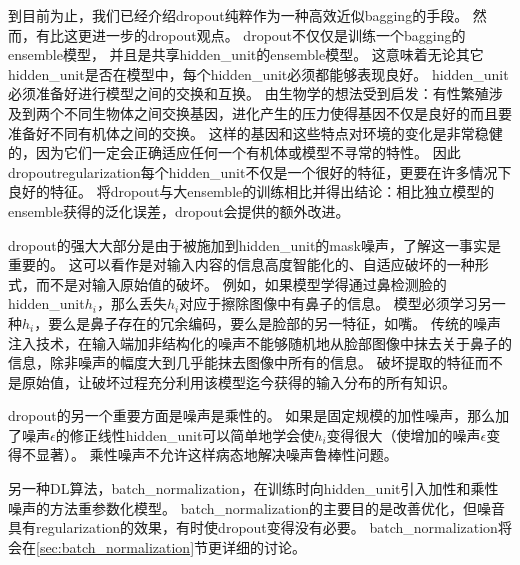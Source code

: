
到目前为止，我们已经介绍\gls{dropout}纯粹作为一种高效近似\gls{bagging}的手段。
然而，有比这更进一步的\gls{dropout}观点。
\gls{dropout}不仅仅是训练一个\gls{bagging}的\gls{ensemble}模型，
并且是共享\gls{hidden_unit}的\gls{ensemble}模型。
这意味着无论其它\gls{hidden_unit}是否在模型中，每个\gls{hidden_unit}必须都能够表现良好。
\gls{hidden_unit}必须准备好进行模型之间的交换和互换。
\cite{Hinton-et-al-arxiv2012-small}由生物学的想法受到启发：有性繁殖涉及到两个不同生物体之间交换基因，进化产生的压力使得基因不仅是良好的而且要准备好不同有机体之间的交换。
这样的基因和这些特点对环境的变化是非常稳健的，因为它们一定会正确适应任何一个有机体或模型不寻常的特性。
因此\gls{dropout}\gls{regularization}每个\gls{hidden_unit}不仅是一个很好的特征，更要在许多情况下良好的特征。
\cite{WardeFarley+al-ICLR2014}将\gls{dropout}与大\gls{ensemble}的训练相比并得出结论：相比独立模型的\gls{ensemble}获得的泛化误差，\gls{dropout}会提供的额外改进。

\gls{dropout}的强大大部分是由于被施加到\gls{hidden_unit}的\gls{mask}噪声，了解这一事实是重要的。
这可以看作是对输入内容的信息高度智能化的、自适应破坏的一种形式，而不是对输入原始值的破坏。
例如，如果模型学得通过鼻检测脸的\gls{hidden_unit}$h_i$，那么丢失$h_i$对应于擦除图像中有鼻子的信息。
模型必须学习另一种$h_i$，要么是鼻子存在的冗余编码，要么是脸部的另一特征，如嘴。
传统的噪声注入技术，在输入端加非结构化的噪声不能够随机地从脸部图像中抹去关于鼻子的信息，除非噪声的幅度大到几乎能抹去图像中所有的信息。
破坏提取的特征而不是原始值，让破坏过程充分利用该模型迄今获得的输入分布的所有知识。

\gls{dropout}的另一个重要方面是噪声是乘性的。
如果是固定规模的加性噪声，那么加了噪声$\epsilon$的修正线性\gls{hidden_unit}可以简单地学会使$h_i$变得很大（使增加的噪声$\epsilon$变得不显著）。
乘性噪声不允许这样病态地解决噪声鲁棒性问题。


另一种\gls{DL}算法，\gls{batch_normalization}，在训练时向\gls{hidden_unit}引入加性和乘性噪声的方法重参数化模型。
\gls{batch_normalization}的主要目的是改善优化，但噪音具有\gls{regularization}的效果，有时使\gls{dropout}变得没有必要。
\gls{batch_normalization}将会在\ref{sec:batch_normalization}节更详细的讨论。



